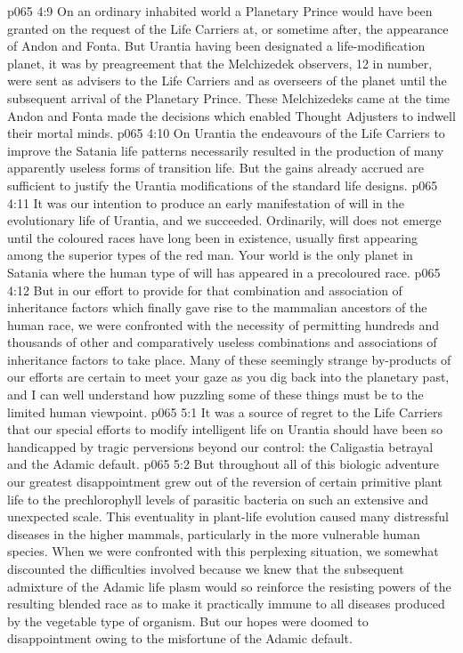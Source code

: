 \vs p065 4:9 On an ordinary inhabited world a Planetary Prince would have been granted on the request of the Life Carriers at, or sometime after, the appearance of Andon and Fonta. But Urantia having been designated a life\hyp{}modification planet, it was by preagreement that the Melchizedek observers, 12 in number, were sent as advisers to the Life Carriers and as overseers of the planet until the subsequent arrival of the Planetary Prince. These Melchizedeks came at the time Andon and Fonta made the decisions which enabled Thought Adjusters to indwell their mortal minds.
\vs p065 4:10 \pc On Urantia the endeavours of the Life Carriers to improve the Satania life patterns necessarily resulted in the production of many apparently useless forms of transition life. But the gains already accrued are sufficient to justify the Urantia modifications of the standard life designs.
\vs p065 4:11 It was our intention to produce an early manifestation of will in the evolutionary life of Urantia, and we succeeded. Ordinarily, will does not emerge until the coloured races have long been in existence, usually first appearing among the superior types of the red man. Your world is the only planet in Satania where the human type of will has appeared in a precoloured race.
\vs p065 4:12 But in our effort to provide for that combination and association of inheritance factors which finally gave rise to the mammalian ancestors of the human race, we were confronted with the necessity of permitting hundreds and thousands of other and comparatively useless combinations and associations of inheritance factors to take place. Many of these seemingly strange by\hyp{}products of our efforts are certain to meet your gaze as you dig back into the planetary past, and I can well understand how puzzling some of these things must be to the limited human viewpoint.
\vs p065 5:1 It was a source of regret to the Life Carriers that our special efforts to modify intelligent life on Urantia should have been so handicapped by tragic perversions beyond our control: the Caligastia betrayal and the Adamic default.
\vs p065 5:2 But throughout all of this biologic adventure our greatest disappointment grew out of the reversion of certain primitive plant life to the prechlorophyll levels of parasitic bacteria on such an extensive and unexpected scale. This eventuality in plant\hyp{}life evolution caused many distressful diseases in the higher mammals, particularly in the more vulnerable human species. When we were confronted with this perplexing situation, we somewhat discounted the difficulties involved because we knew that the subsequent admixture of the Adamic life plasm would so reinforce the resisting powers of the resulting blended race as to make it practically immune to all diseases produced by the vegetable type of organism. But our hopes were doomed to disappointment owing to the misfortune of the Adamic default.
